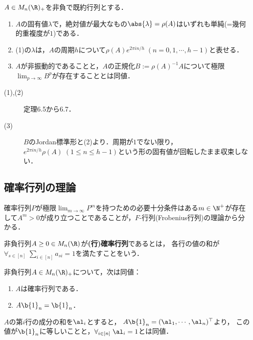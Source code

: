 \documentclass[uplatex,dvipdfmx]{jsarticle}
\begin{document}
\begin{theorem}[非負行列の極限]\label{thm-limit-of-nonnegative-matrix}
    $A\in M_n(\R)_+$を非負で既約行列とする．
    \begin{enumerate}
        \item $A$の固有値$\lambda$で，絶対値が最大なもの$\abs{\lambda}=\rho(A)$はいずれも単純(=幾何的重複度が$1$)である．
        \item (1)の$\lambda$は，$A$の周期$h$について$\rho(A)e^{2\pi in/h}\;(n=0,1,\cdots,h-1)$と表せる．
        \item $A$が非振動的であることと，$A$の正規化$B:=\rho(A)^{-1}A$について極限$\lim_{p\to\infty}B^p$が存在することとは同値．
    \end{enumerate}
\end{theorem}
\begin{Proof}\mbox{}
    \begin{description}
        \item[(1),(2)] \cite{岩堀77-線型不等式}定理6.5から6.7．
        \item[(3)] $B$のJordan標準形と(2)より．周期が$1$でない限り，$e^{2\pi in/h}\rho(A)\;(1\le n\le h-1)$という形の固有値が回転したまま収束しない．
    \end{description}
\end{Proof}

\subsection{確率行列の理論}

\begin{tcolorbox}[colframe=ForestGreen, colback=ForestGreen!10!white,breakable,colbacktitle=ForestGreen!40!white,coltitle=black,fonttitle=\bfseries\sffamily,
title=]
    確率行列$P$が極限$\lim_{m\to\infty}P^m$を持つための必要十分条件はある$m\in\N^+$が存在して$A^m>0$が成り立つことであることが，$F$-行列(Frobenius行列)の理論から分かる．
\end{tcolorbox}

\begin{definition}
    非負行列$A\ge0\in M_n(\R)$が\textbf{(行)確率行列}であるとは，
    各行の値の和が$\forall_{s\in[n]}\;\sum_{i\in[n]}a_{si}=1$を満たすことをいう．
\end{definition}

\begin{lemma}[行確率行列の特徴付け]
    非負行列$A\in M_n(\R)_+$について，次は同値：
    \begin{enumerate}
        \item $A$は確率行列である．
        \item $A\b{1}_n=\b{1}_n$．
    \end{enumerate}
\end{lemma}
\begin{Proof}
    $A$の第$i$行の成分の和を$\al_i$とすると，
    $A\b{1}_n=(\al_1,\cdots,\al_n)^\top$より，
    この値が$\b{1}_n$に等しいことと，$\forall_{i\in[n]}\;\al_i=1$とは同値．
\end{Proof}
\end{document}
